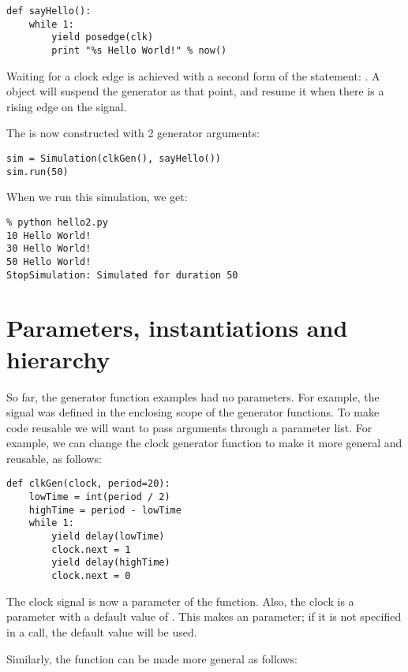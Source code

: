 \begin{verbatim}
def sayHello():
    while 1:
        yield posedge(clk)
        print "%s Hello World!" % now()
\end{verbatim}

Waiting for a clock edge is achieved with a second form of the
 statement: . 
A  object will suspend the generator as that point,
and resume it when there is a rising edge on the signal.

The  is now constructed with 2 generator arguments:

\begin{verbatim}
sim = Simulation(clkGen(), sayHello())
sim.run(50)
\end{verbatim}

When we run this simulation, we get:

\begin{verbatim}
% python hello2.py
10 Hello World!
30 Hello World!
50 Hello World!
StopSimulation: Simulated for duration 50
\end{verbatim}


\section{Parameters, instantiations and hierarchy \label{intro-hier}}

So far, the generator function examples had no parameters. For
example, the  signal was defined in the enclosing scope of
the generator functions. To make code reusable we will
want to pass arguments through a parameter list. For example, we can
change the clock generator function to make it more general
and reusable, as follows:

\begin{verbatim}
def clkGen(clock, period=20):
    lowTime = int(period / 2)
    highTime = period - lowTime
    while 1:
        yield delay(lowTime)
        clock.next = 1
        yield delay(highTime)
        clock.next = 0
\end{verbatim}

The clock signal is now a parameter of the function. Also, the clock
 is a parameter with a default value of .
This makes  an  parameter; if it is not
specified in a call, the default value will be used.

Similarly, the  function can be made more general as follows:

